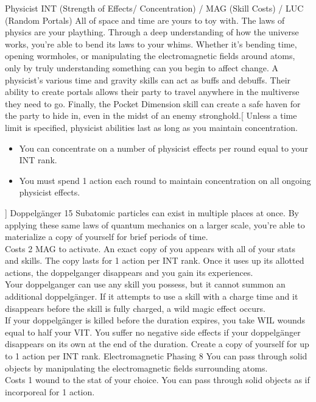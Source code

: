 ﻿\begin{path}
{Physicist}
{INT (Strength of Effects/ Concentration) / MAG (Skill Costs) / LUC (Random Portals)}
{All of space and time are yours to toy with. The laws of physics are your plaything. Through a deep understanding of how the universe works, you're able to bend its laws to your whims. Whether it's bending time, opening wormholes, or manipulating the electromagnetic fields around atoms, only by truly understanding something can you begin to affect change.}
{A physicist's various time and gravity skills can act as buffs and debuffs. Their ability to create portals allows their party to travel anywhere in the multiverse they need to go. Finally, the Pocket Dimension skill can create a safe haven for the party to hide in, even in the midst of an enemy stronghold.}[
Unless a time limit is specified, physicist abilities last as long as you maintain concentration.
\begin{itemize}
\item You can concentrate on a number of physicist effects per round equal to your INT rank.
\item You must spend 1 action each round to maintain concentration on all ongoing physicist effects.
\end{itemize}]
\skilldescription
{Doppelgänger}
{15}
{Subatomic particles can exist in multiple places at once. By applying these same laws of quantum mechanics on a larger scale, you're able to materialize a copy of yourself for brief periods of time.
\\Costs 2 MAG to activate. An exact copy of you appears with all of your stats and skills. The copy lasts for 1 action per INT rank. Once it uses up its allotted actions, the doppelganger disappears and you gain its experiences.
\\Your doppelganger can use any skill you possess, but it cannot summon an additional doppelgänger. If it attempts to use a skill with a charge time and it disappears before the skill is fully charged, a wild magic effect occurs.
\\If your doppelgänger is killed before the duration expires, you take WIL wounds equal to half your VIT. You suffer no negative side effects if your doppelgänger disappears on its own at the end of the duration.}
{Create a copy of yourself for up to 1 action per INT rank.}
\skilldescription
{Electromagnetic Phasing}
{8}
{You can pass through solid objects by manipulating the electromagnetic fields surrounding atoms.
\\Costs 1 wound to the stat of your choice. You can pass through solid objects as if incorporeal for 1 action.}

\end{path}

